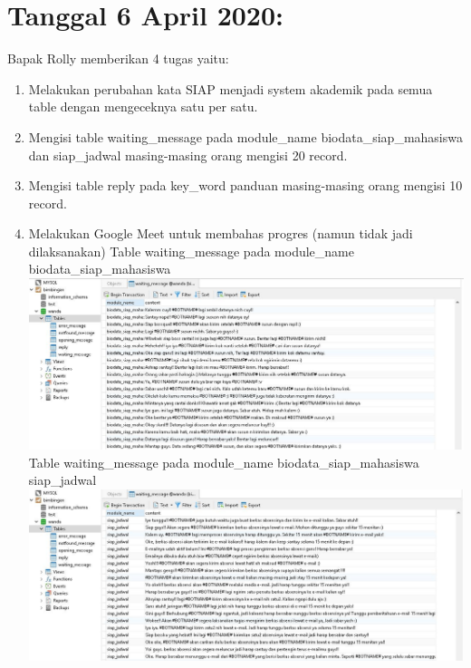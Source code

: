 \documentclass{article}
\begin{document}
\section{Tanggal 6 April 2020:}
	Bapak Rolly memberikan 4 tugas yaitu:
		\newline
		\begin{enumerate}
			\item Melakukan perubahan kata SIAP menjadi system akademik pada semua table dengan mengeceknya satu per satu.
			\newline
			\item Mengisi table waiting\_message pada module\_name biodata\_siap\_mahasiswa dan siap\_jadwal masing-masing orang mengisi 20 record.
			\newline
			\item Mengisi table reply pada key\_word panduan masing-masing orang mengisi 10 record.
			\newline
			\item Melakukan Google Meet untuk membahas progres (namun tidak jadi dilaksanakan)
			\newline
			Table waiting\_message pada module\_name biodata\_siap\_mahasiswa
			\newline
			\includegraphics[scale=0.4]{37.1.jpg}
			\newline
			Table waiting\_message pada module\_name biodata\_siap\_mahasiswa siap\_jadwal
			\newline
			\includegraphics[scale=0.4]{37.2.jpg}
			\newline

\end{enumerate}
\end{document}
